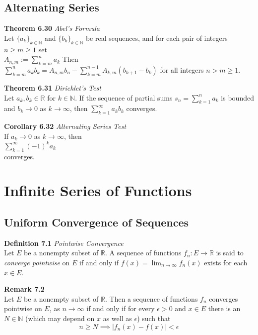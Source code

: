 \documentclass[8pt,landscape]{article}
\begin{document}
\begin{multicols}{3}
\subsection{Alternating Series}

\textbf{Theorem 6.30} \emph{Abel's Formula} \\
Let ${\{a_k\}}_{k \in \mathbb{N}}$ and ${\{b_k\}}_{k \in \mathbb{N}}$ be real
sequences, and for each pair of integers $n \geq m \geq 1$ set \\
$A_{n, m} := \sum_{k=m}^n a_k$
Then \\
$\sum_{k=m}^n a_k b_k = A_{n, m} b_n - \sum_{k=m}^{n-1} A_{k, m} (b_{k+1} - b_k)$
for all integers $n > m \geq 1$.

\textbf{Theorem 6.31} \emph{Dirichlet's Test} \\
Let $a_k, b_k \in \mathbb{R}$ for $k \in \mathbb{N}$.
If the sequence of partial sums $s_n = \sum_{k=1}^n a_k$ is bounded and
$b_k \to 0$ as $k \to \infty$, then $\sum_{k=1}^\infty a_k b_k$ converges.

\textbf{Corollary 6.32} \emph{Alternating Series Test} \\
If $a_k \to 0$ as $k \to \infty$, then \\
$\sum_{k=1}^\infty {(-1)}^k a_k$ \\
converges.

\section{Infinite Series of Functions}

\subsection{Uniform Convergence of Sequences}

\textbf{Definition 7.1} \emph{Pointwise Convergence} \\
Let $E$ be a nonempty subset of $\mathbb{R}$.
A sequence of functions $f_n : E \to \mathbb{R}$ is said to \emph{converge pointwise}
on $E$ if and only if $f(x) = \lim_{n \to \infty} f_n(x)$ exists for each $x \in E$.

\textbf{Remark 7.2} \\
Let $E$ be a nonempty subset of $\mathbb{R}$.
Then a sequence of functions $f_n$ converges pointwise on $E$, as $n \to \infty$
if and only if for every $\epsilon > 0$ and $x \in E$ there is an $N \in \mathbb{N}$
(which may depend on $x$ as well as $\epsilon$) such that
\[
    n \geq N \implies |f_n(x) - f(x)| < \epsilon
\]


\end{multicols}
\end{document}
